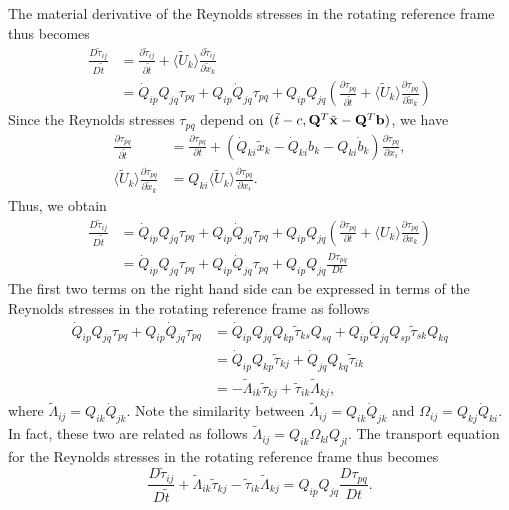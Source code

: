 \documentclass[oneside,a4paper,11pt]{report}
\newcommand{\rs}{\tau}          %
\begin{document}
The material derivative of the Reynolds stresses in the rotating reference frame thus becomes
\begin{align}
\frac{D \tilde{\rs}_{ij}}{D \tilde{t}} &= \frac{\partial \tilde{\rs}_{ij} }{\partial \tilde{t}} + \langle \tilde{U}_k \rangle \frac{\partial \tilde{\rs}_{ij} }{\partial \tilde{x}_k} \nonumber \\
& = \dot{Q}_{ip}Q_{jq} \rs_{pq} + Q_{ip} \dot{Q}_{jq} \rs_{pq} + Q_{ip}Q_{jq} \left ( \frac{\partial \rs_{pq} }{\partial \tilde{t}} + \langle \tilde{U}_k \rangle \frac{\partial \rs_{pq} }{\partial \tilde{x}_k} \right ) 
\end{align}
Since the Reynolds stresses $\rs_{pq}$ depend on $(\tilde{t} - c,\bold{Q}^T\tilde{\mathbf{x}} - \bold{Q}^T \mathbf{b})$, we have
\begin{align}
\frac{\partial \rs_{pq} }{\partial \tilde{t}} &=  \frac{\partial \rs_{pq} }{\partial t} + (\dot{Q}_{ki} \tilde{x}_k - \dot{Q}_{ki} b_k - Q_{ki}\dot{b}_k) \frac{\partial \rs_{pq} }{\partial x_i}, \nonumber \\
\langle \tilde{U}_k \rangle \frac{\partial \rs_{pq} }{\partial \tilde{x}_k} &= Q_{ki} \langle \tilde{U}_k \rangle \frac{\partial \rs_{pq} }{\partial x_i} .
\end{align}
Thus, we obtain
\begin{align}
\frac{D \tilde{\rs}_{ij} }{D \tilde{t}} &= \dot{Q}_{ip}Q_{jq} \rs_{pq} + Q_{ip} \dot{Q}_{jq} \rs_{pq} + Q_{ip}Q_{jq} \left ( \frac{\partial \rs_{pq} }{\partial t} + \langle U_k \rangle \frac{\partial \rs_{pq} }{\partial x_k} \right ) \nonumber \\
& = \dot{Q}_{ip}Q_{jq} \rs_{pq} + Q_{ip} \dot{Q}_{jq} \rs_{pq} + Q_{ip}Q_{jq} \frac{D \rs_{pq} }{D t} 
\end{align}
The first two terms on the right hand side can be expressed in terms of the Reynolds stresses in the rotating reference frame as follows
\begin{align}
\label{trans_eq_additional_terms}
\dot{Q}_{ip}Q_{jq} \rs_{pq} + Q_{ip} \dot{Q}_{jq} \rs_{pq} &= \dot{Q}_{ip}Q_{jq} Q_{kp} \tilde{\rs}_{ks} Q_{sq} + Q_{ip} \dot{Q}_{jq} Q_{sp} \tilde{\rs}_{sk} Q_{kq} \nonumber \\
& = \dot{Q}_{ip}Q_{kp} \tilde{\rs}_{kj} + \dot{Q}_{jq}Q_{kq} \tilde{\rs}_{ik} \nonumber \\
& = -\tilde{\Lambda}_{ik} \tilde{\rs}_{kj} + \tilde{\rs}_{ik} \tilde{\Lambda}_{kj},
\end{align}
where $\tilde{\Lambda}_{ij} = Q_{ik}\dot{Q}_{jk}$. Note the similarity between $\tilde{\Lambda}_{ij} = Q_{ik}\dot{Q}_{jk}$ and $\Omega_{ij} = Q_{kj}\dot{Q}_{ki}$. In fact, these two are related as follows $\tilde{\Lambda}_{ij} = Q_{ik}\Omega_{kl}Q_{jl}$. The transport equation for the Reynolds stresses in the rotating reference frame thus becomes
\begin{equation}
\label{reynolds_stress_transport_eq_noninertial}
\frac{D \tilde{\rs}_{ij} }{D \tilde{t}} + \tilde{\Lambda}_{ik} \tilde{\rs}_{kj} - \tilde{\rs}_{ik} \tilde{\Lambda}_{kj} = Q_{ip}Q_{jq} \frac{D \rs_{pq}}{D t} . 
\end{equation}
\end{document}
